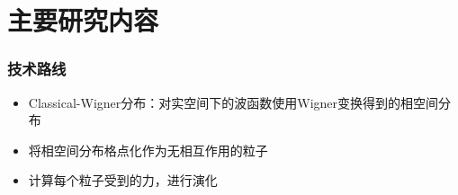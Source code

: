 \documentclass{beamer}
\begin{document}
\section{主要研究内容}

\begin{frame}[t]\frametitle{技术路线}
\vfill
\begin{itemize}
	\item Classical-Wigner分布：对实空间下的波函数使用Wigner变换得到的相空间分布
	\item 将相空间分布格点化作为无相互作用的粒子
	\item 计算每个粒子受到的力，进行演化
\end{itemize}

\begin{figure}
\end{figure}


\end{frame}
\end{document}
